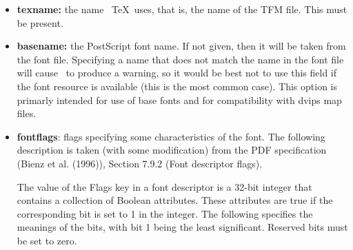 \begin{itemize}

  \item \textbf{texname:} the name \ \TeX\  uses, that is, the name of the TFM file. This must be 
  present. 
  
  \item \textbf{basename:} the PostScript font name. If not given, then it will be taken from the 
  font file. Specifying a name that does not match the name in the font file will 
  cause \pdfTEX\  to produce a warning, so it would be best not to use this field 
  if the font resource is available (this is the most common case). This option is 
  primarly intended for use of base fonts and for compatibility with dvips map 
  files. 
  
  \item \textbf{fontflags}: flags specifying some characteristics of the
    font. The following description is taken (with some modification)
    from the PDF specification (Bienz et al.  (1996)), Section 7.9.2
    (Font descriptor flags). 
  
  The value of the Flags key in a font descriptor is a 32-bit integer that
  contains a collection of Boolean attributes. These attributes are true
  if the corresponding bit is set to 1 in the integer. The following
  specifies the meanings of the bits, with bit 1 being the least
  significant. Reserved bits must be set to zero. 
  

\end{itemize}

